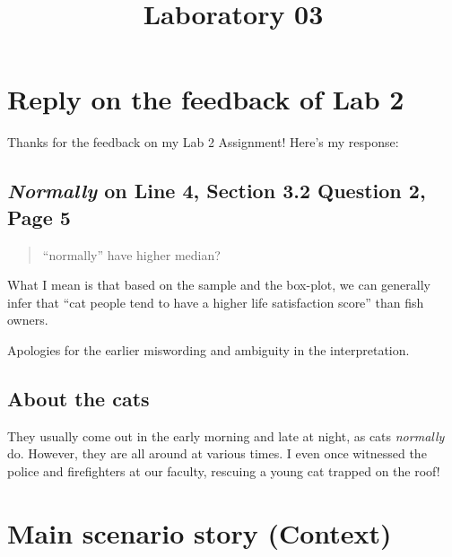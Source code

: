 \documentclass[
  a4paper,
  DIV=11,
  numbers=noendperiod]{scrartcl}
\title{Laboratory 03}
\author{}
\date{}
\renewcommand*\contentsname{Table of contents}
\newcommand\contentsname{Table of contents}
\begin{document}
\maketitle

\renewcommand*\contentsname{Table of contents}
{
\hypersetup{linkcolor=}
\setcounter{tocdepth}{3}
\tableofcontents
}

\section{Reply on the feedback of Lab
2}\label{reply-on-the-feedback-of-lab-2}

Thanks for the feedback on my Lab 2 Assignment! Here's my response:

\subsection{\texorpdfstring{\emph{Normally} on Line 4, Section 3.2
Question 2, Page
5}{Normally on Line 4, Section 3.2 Question 2, Page 5}}\label{normally-on-line-4-section-3.2-question-2-page-5}

\begin{quote}
``normally'' have higher median?
\end{quote}

What I mean is that based on the sample and the box-plot, we can
generally infer that ``cat people tend to have a higher life
satisfaction score'' than fish owners.

Apologies for the earlier miswording and ambiguity in the
interpretation.

\subsection{About the cats}\label{about-the-cats}

They usually come out in the early morning and late at night, as cats
\emph{normally} do. However, they are all around at various times. I
even once witnessed the police and firefighters at our faculty, rescuing
a young cat trapped on the roof!

\section{Main scenario story
(Context)}\label{main-scenario-story-context}
\end{document}
